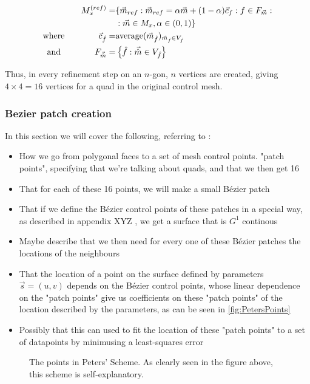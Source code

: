 \begin{align}
\petersControlMesh^{(ref)} =& \lbrace \vec{m}_{ref} \suchthat \vec{m}_{ref} = \alpha\vec{m} + (1-\alpha)\centroidof{f} \suchthat f \in \facesof{\vec{m}} \suchthat
\\ \notag &
 \suchthat \vec{m} \in \petersControlMesh, \alpha \in (0,1) \rbrace
\\
\where \qquad\qquad \centroidof{\hat{f}} =& \text{average}(\vec{m}_{\hat{f}})_{\vec{m}_{\hat{f}} \in \verticesof{\hat{f}}}
\\
\text{and} \qquad\qquad F_{\vec{\hat{m}}} =& \left\lbrace \hat{f} \suchthat \vec{\hat{m}} \in \verticesof{\hat{f}}	\right\rbrace
\end{align}

Thus, in every refinement step on an $n$-gon, $n$ vertices are created, giving $4 \times 4 = 16$ vertices for a quad in the original control mesh.

\subsubsection{Bezier patch creation}



In this section we will cover the following, referring to \cite{peters1992constructing}:
\begin{itemize}
\item How we go from polygonal faces to a set of mesh control points. "patch points", specifying that we're talking about quads, and that we then get 16
\item That for each of these 16 points, we will make a small B{\'e}zier patch
\item That if we define the B{\'e}zier control points of these patches in a special way, as described in appendix XYZ , we get a surface that is $G^1$ continous
\item Maybe describe that we then need for every one of these B{\'e}zier patches the locations of the neighbours
\item That the location of a point on the surface defined by parameters $\vec{s} = (u,v)$ depends on the B{\'e}zier control points, whose linear dependence on the "patch points" give us coefficients on these "patch points" of the location described by the parameters, as can be seen in \autoref{fig:PetersPoints}
\item Possibly that this can used to fit the location of these "patch points" to a set of datapoints by minimusing a least-squares error 
\end{itemize}
\begin{figure}

\label{fig:PetersPoints}
\caption{The points in Peters' Scheme. As clearly seen in the figure above, this scheme is self-explanatory.}
\end{figure}
